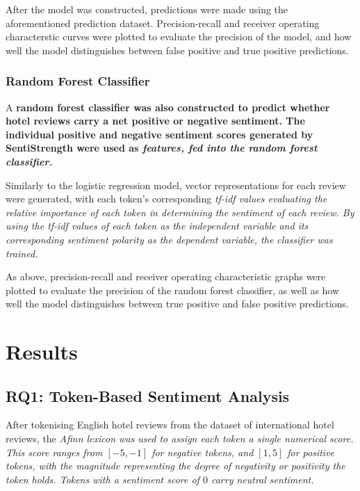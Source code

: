 \documentclass[12pt,bibliography=totocnumbered]{scrartcl}
\begin{document}
{After the model was constructed, predictions were made using the aforementioned
prediction dataset. Precision-recall and receiver operating characterstic curves
were plotted to evaluate the precision of the model,
and how well the model distinguishes between false positive and true positive predictions.

\subsubsection{Random Forest Classifier}
A \bf{random forest classifier} was also constructed
to predict whether hotel reviews carry a net positive or
negative sentiment. The individual positive and negative sentiment
scores generated by SentiStrength were used as \it{features},
fed into the random forest classifier.

Similarly to the logistic regression model,
vector representations for each review were generated,
with each token's corresponding \it{tf-idf} values evaluating the
relative importance of each token in determining the sentiment
of each review. By using the \it{tf-idf} values of each token as
the independent variable and its corresponding sentiment polarity
as the dependent variable, the classifier was trained.

As above, precision-recall and receiver operating characteristic
graphs were plotted to evaluate the precision of the random forest
classifier, as well as how well the model distinguishes between true
positive and false positive predictions.

\section{Results}
\subsection{RQ1: Token-Based Sentiment Analysis}
After tokenising English hotel reviews from the dataset of international hotel reviews,
the \it{Afinn} lexicon was used to assign each token a single numerical score. This
score ranges from $[-5, -1]$ for negative tokens, and $[1, 5]$ for positive tokens,
with the magnitude representing the degree of negativity or positivity the token holds.
Tokens with a sentiment score of $0$ carry neutral sentiment.

}
\end{document}
